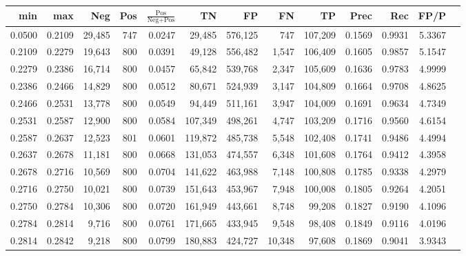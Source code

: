 \begin{tabular}{rrrrrrrrrrrrr}
\toprule
   min &    max &    Neg &   Pos & $\frac{\text{Pos}}{\text{Neg}+\text{Pos}}$ &      TN &      FP &      FN &      TP &   Prec &    Rec &   FP/P \\
\midrule
0.0500 & 0.2109 & 29,485 &   747 &                                     0.0247 &  29,485 & 576,125 &     747 & 107,209 & 0.1569 & 0.9931 & 5.3367 \\
0.2109 & 0.2279 & 19,643 &   800 &                                     0.0391 &  49,128 & 556,482 &   1,547 & 106,409 & 0.1605 & 0.9857 & 5.1547 \\
0.2279 & 0.2386 & 16,714 &   800 &                                     0.0457 &  65,842 & 539,768 &   2,347 & 105,609 & 0.1636 & 0.9783 & 4.9999 \\
0.2386 & 0.2466 & 14,829 &   800 &                                     0.0512 &  80,671 & 524,939 &   3,147 & 104,809 & 0.1664 & 0.9708 & 4.8625 \\
0.2466 & 0.2531 & 13,778 &   800 &                                     0.0549 &  94,449 & 511,161 &   3,947 & 104,009 & 0.1691 & 0.9634 & 4.7349 \\
0.2531 & 0.2587 & 12,900 &   800 &                                     0.0584 & 107,349 & 498,261 &   4,747 & 103,209 & 0.1716 & 0.9560 & 4.6154 \\
0.2587 & 0.2637 & 12,523 &   801 &                                     0.0601 & 119,872 & 485,738 &   5,548 & 102,408 & 0.1741 & 0.9486 & 4.4994 \\
0.2637 & 0.2678 & 11,181 &   800 &                                     0.0668 & 131,053 & 474,557 &   6,348 & 101,608 & 0.1764 & 0.9412 & 4.3958 \\
0.2678 & 0.2716 & 10,569 &   800 &                                     0.0704 & 141,622 & 463,988 &   7,148 & 100,808 & 0.1785 & 0.9338 & 4.2979 \\
0.2716 & 0.2750 & 10,021 &   800 &                                     0.0739 & 151,643 & 453,967 &   7,948 & 100,008 & 0.1805 & 0.9264 & 4.2051 \\
0.2750 & 0.2784 & 10,306 &   800 &                                     0.0720 & 161,949 & 443,661 &   8,748 &  99,208 & 0.1827 & 0.9190 & 4.1096 \\
0.2784 & 0.2814 &  9,716 &   800 &                                     0.0761 & 171,665 & 433,945 &   9,548 &  98,408 & 0.1849 & 0.9116 & 4.0196 \\
0.2814 & 0.2842 &  9,218 &   800 &                                     0.0799 & 180,883 & 424,727 &  10,348 &  97,608 & 0.1869 & 0.9041 & 3.9343 \\

\end{tabular}
